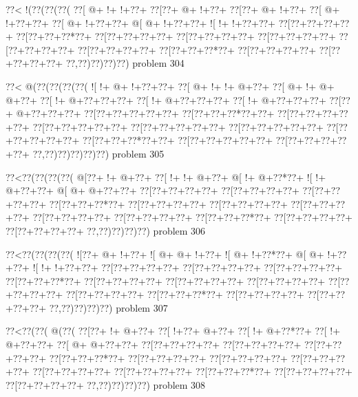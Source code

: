 \vbox{\vbox{\goo
\0??<\- !(\0??(\0??(\0??(
\0??[\- @+\- !+\- !+\0??+
\0??[\0??+\- @+\- !+\0??+
\0??[\0??+\- @+\- !+\0??+
\0??[\- @+\- !+\0??+\0??+
\0??[\- @+\- !+\0??+\0??+
\- @[\- @+\- !+\0??+\0??+
\- ![\- !+\- !+\0??+\0??+
\0??[\0??+\0??+\0??+\0??+
\0??[\0??+\0??+\0??*\0??+
\0??[\0??+\0??+\0??+\0??+
\0??[\0??+\0??+\0??+\0??+
\0??[\0??+\0??+\0??+\0??+
\0??[\0??+\0??+\0??+\0??+
\0??[\0??+\0??+\0??+\0??+
\0??[\0??+\0??+\0??*\0??+
\0??[\0??+\0??+\0??+\0??+
\0??[\0??+\0??+\0??+\0??+
\0??,\0??)\0??)\0??)\0??)
}
\hfil problem 304\hfil\break
}

\vbox{\vbox{\goo
\0??<\- @(\0??(\0??(\0??(\0??(
\- ![\- !+\- @+\- !+\0??+\0??+
\0??[\- @+\- !+\- !+\- @+\0??+
\0??[\- @+\- !+\- @+\- @+\0??+
\0??[\- !+\- @+\0??+\0??+\0??+
\0??[\- !+\- @+\0??+\0??+\0??+
\0??[\- !+\- @+\0??+\0??+\0??+
\0??[\0??+\- @+\0??+\0??+\0??+
\0??[\0??+\0??+\0??+\0??+\0??+
\0??[\0??+\0??+\0??*\0??+\0??+
\0??[\0??+\0??+\0??+\0??+\0??+
\0??[\0??+\0??+\0??+\0??+\0??+
\0??[\0??+\0??+\0??+\0??+\0??+
\0??[\0??+\0??+\0??+\0??+\0??+
\0??[\0??+\0??+\0??+\0??+\0??+
\0??[\0??+\0??+\0??*\0??+\0??+
\0??[\0??+\0??+\0??+\0??+\0??+
\0??[\0??+\0??+\0??+\0??+\0??+
\0??,\0??)\0??)\0??)\0??)\0??)
}
\hfil problem 305\hfil\break
}

\vbox{\vbox{\goo
\0??<\0??(\0??(\0??(\0??(
\- @[\0??+\- !+\- @+\0??+
\0??[\- !+\- !+\- @+\0??+
\- @[\- !+\- @+\0??*\0??+
\- ![\- !+\- @+\0??+\0??+
\- @[\- @+\- @+\0??+\0??+
\0??[\0??+\0??+\0??+\0??+
\0??[\0??+\0??+\0??+\0??+
\0??[\0??+\0??+\0??+\0??+
\0??[\0??+\0??+\0??*\0??+
\0??[\0??+\0??+\0??+\0??+
\0??[\0??+\0??+\0??+\0??+
\0??[\0??+\0??+\0??+\0??+
\0??[\0??+\0??+\0??+\0??+
\0??[\0??+\0??+\0??+\0??+
\0??[\0??+\0??+\0??*\0??+
\0??[\0??+\0??+\0??+\0??+
\0??[\0??+\0??+\0??+\0??+
\0??,\0??)\0??)\0??)\0??)
}
\hfil problem 306\hfil\break
}

\vbox{\vbox{\goo
\0??<\0??(\0??(\0??(\0??(
\- ![\0??+\- @+\- !+\0??+
\- ![\- @+\- @+\- !+\0??+
\- ![\- @+\- !+\0??*\0??+
\- @[\- @+\- !+\0??+\0??+
\- ![\- !+\- !+\0??+\0??+
\0??[\0??+\0??+\0??+\0??+
\0??[\0??+\0??+\0??+\0??+
\0??[\0??+\0??+\0??+\0??+
\0??[\0??+\0??+\0??*\0??+
\0??[\0??+\0??+\0??+\0??+
\0??[\0??+\0??+\0??+\0??+
\0??[\0??+\0??+\0??+\0??+
\0??[\0??+\0??+\0??+\0??+
\0??[\0??+\0??+\0??+\0??+
\0??[\0??+\0??+\0??*\0??+
\0??[\0??+\0??+\0??+\0??+
\0??[\0??+\0??+\0??+\0??+
\0??,\0??)\0??)\0??)\0??)
}
\hfil problem 307\hfil\break
}

\vbox{\vbox{\goo
\0??<\0??(\0??(\- @(\0??(
\0??[\0??+\- !+\- @+\0??+
\0??[\- !+\0??+\- @+\0??+
\0??[\- !+\- @+\0??*\0??+
\0??[\- !+\- @+\0??+\0??+
\0??[\- @+\- @+\0??+\0??+
\0??[\0??+\0??+\0??+\0??+
\0??[\0??+\0??+\0??+\0??+
\0??[\0??+\0??+\0??+\0??+
\0??[\0??+\0??+\0??*\0??+
\0??[\0??+\0??+\0??+\0??+
\0??[\0??+\0??+\0??+\0??+
\0??[\0??+\0??+\0??+\0??+
\0??[\0??+\0??+\0??+\0??+
\0??[\0??+\0??+\0??+\0??+
\0??[\0??+\0??+\0??*\0??+
\0??[\0??+\0??+\0??+\0??+
\0??[\0??+\0??+\0??+\0??+
\0??,\0??)\0??)\0??)\0??)
}
\hfil problem 308\hfil\break
}

